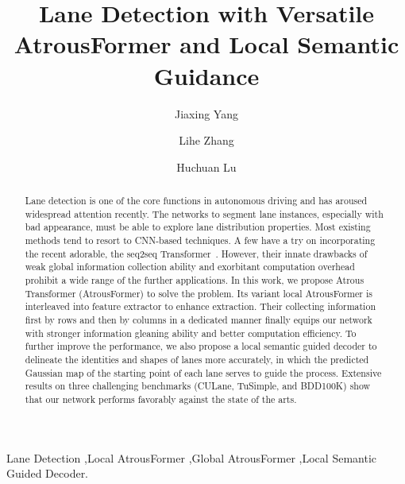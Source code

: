 \documentclass[preprint,12pt,review]{elsarticle}
\begin{document}
\begin{frontmatter}

\title{Lane Detection with Versatile AtrousFormer and Local Semantic Guidance}

\author[label1]{Jiaxing Yang}
\address[label1]{School of Information and Communication Engineering,
                 Dalian University of Technology, Dalian, 116023, China}






\author[label1]{Lihe Zhang}
\cortext[cor1]{}

\author[label1]{Huchuan Lu}

\begin{abstract}
 Lane detection is one of the core functions in autonomous driving and has aroused widespread attention recently. The networks to segment lane instances, especially with bad appearance, must be able to explore lane distribution properties. Most existing methods tend to resort to CNN-based techniques. A few have a try on incorporating the recent adorable, the seq2seq Transformer~\cite{transformer}. However, their innate drawbacks of weak global information collection ability and exorbitant computation overhead prohibit a wide range of the further applications. In this work, we propose Atrous Transformer (AtrousFormer) to solve the problem. Its variant local AtrousFormer is interleaved into feature extractor to enhance extraction. Their collecting information first by rows and then by columns in a dedicated manner finally equips our network with stronger information gleaning ability and better computation efficiency. To further improve the performance, we also propose a local semantic guided decoder to delineate the identities and shapes of lanes more accurately, in which the predicted Gaussian map of the starting point of each lane serves to guide the process. Extensive results on three challenging benchmarks (CULane, TuSimple, and BDD100K) show that our network performs favorably against the state of the arts.
\end{abstract}

\begin{keyword}
Lane Detection \sep Local AtrousFormer \sep Global AtrousFormer \sep Local Semantic Guided Decoder.
\end{keyword}

\end{frontmatter}
\end{document}
